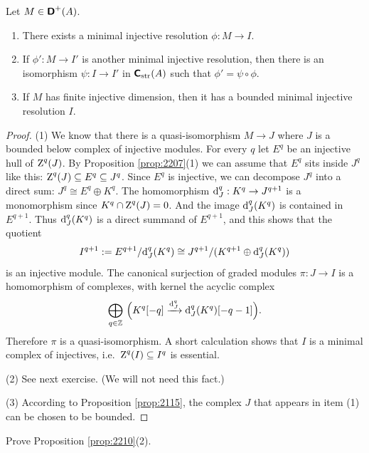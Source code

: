 \begin{prop} \label{prop:2210}
Let $M \in \boldsymbol{\mathsf{D}}^+(A)$.
\begin{enumerate}
\item  There exists a minimal injective resolution $\phi : M \to I$.

\item If $\phi' : M \to I'$ is another minimal injective resolution, then there 
is an isomorphism $\psi : I \to I'$ in $\boldsymbol{\mathsf{C}}_{\mathrm{str}}(A)$ such that 
$\phi' = \psi \circ \phi$.

\item If $M$ has finite injective dimension, then it has a bounded minimal 
injective resolution $I$. 
\end{enumerate}
\end{prop}

\begin{proof}
(1) We know that there is a quasi-isomorphism $M \to J$ where $J$ is a bounded 
below complex of injective modules. For every $q$ let $E^q$ be an injective 
hull of $\operatorname{Z}^q(J)$. By Proposition \ref{prop:2207}(1) we can assume that 
$E^q$ sits inside $J^q$ like this: $\operatorname{Z}^q(J) \subseteq E^q \subseteq J^q$.
Since $E^q$ is injective, we can decompose $J^q$ into a direct sum:
$J^q \cong E^q \oplus K^q$. The homomorphism 
$\mathrm{d}_J^q : K^q \to J^{q + 1}$ 
is a monomorphism since $K^q \cap \operatorname{Z}^q(J) = 0$.
And the image $\mathrm{d}_J^q(K^q)$ is contained in $E^{q + 1}$. 
Thus $\mathrm{d}_J^q(K^q)$ is a direct summand of $E^{q + 1}$, and this shows that the 
quotient
\[ I ^{q + 1} := E^{q + 1} / \mathrm{d}_J^q(K^q) \cong
J^{q + 1} / (K^{q + 1} \oplus \mathrm{d}_J^q(K^q)) \]
is an injective module. The canonical surjection of graded modules 
$\pi : J \to I$ is a homomorphism of complexes, with kernel the acyclic complex 
\[ \bigoplus_{q \in \mathbb{Z}} \ \Bigl( K^q[-q] \xrightarrow{\mathrm{d}_J^q} \mathrm{d}_J^q(K^q)[-q - 1] 
\Bigr) . \]
Therefore $\pi$ is a quasi-isomorphism. A short calculation shows that $I$ is a 
minimal complex of injectives, i.e.\ $\operatorname{Z}^q(I) \subseteq I^q$ is essential. 

\medskip \noindent
(2) See next exercise. (We will not need this fact.) 

\medskip \noindent
(3) According to Proposition \ref{prop:2115}, the complex $J$ that appears in 
item (1) can be chosen to be bounded. 
\end{proof}

\begin{exer} \label{exer:2215}
Prove Proposition \ref{prop:2210}(2). 
\end{exer}

